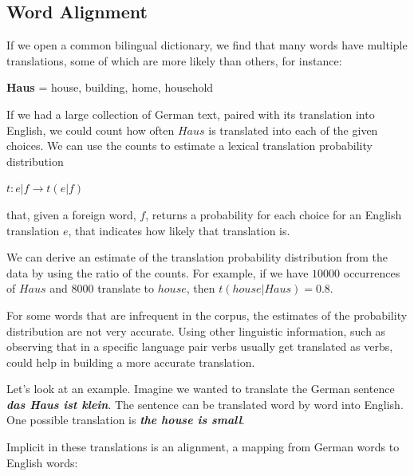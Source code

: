 \documentclass[11pt]{report}
\theoremstyle{plain}
\begin{document}
{\subsection{Word Alignment}

If we open a common bilingual dictionary, we find that many words have multiple translations, some of which are more likely
than others, for instance:

\begin{center}
\textbf{Haus} = house, building, home, household
\end{center}

If we had a large collection of German text, paired with its
translation into English, we could count how often $Haus$ is
translated into each of the given choices. We can use the counts to
estimate a lexical translation probability distribution

\begin{center}
$t : e|f \rightarrow t(e|f)$
\end{center}

that, given a foreign word, $f$, returns a probability for each
choice for an English translation $e$, that indicates how likely
that translation is.


We can derive an estimate of the translation probability
distribution from the data by using the ratio of the counts. For
example, if we have $10000$ occurrences of $Haus$ and $8000$
translate to $house$, then $t(house|Haus)=0.8$.

For some words that are infrequent in the corpus, the estimates of
the probability distribution are not very accurate. Using other
linguistic information, such as observing that in a specific
language pair verbs usually get translated as verbs, could help in
building a more accurate translation.

Let's look at an example. Imagine we wanted to translate the German
sentence \textbf{\emph{das Haus ist klein}}. The sentence can be
translated word by word into English. One possible translation is
\textbf{\emph{the house is small}}.


Implicit in these translations is an alignment, a mapping from
German words to English words:

}
\end{document}
